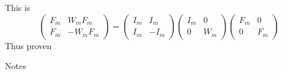 \documentclass{article}
\begin{document}
	This is
	\begin{equation}
		\begin{pmatrix}
			F_m & W_mF_m \\
			F_m & -W_mF_m
		\end{pmatrix}
		=
		\begin{pmatrix}
			I_m & I_m \\
			I_m & -I_m
		\end{pmatrix}
		\begin{pmatrix}
			I_m & 0 \\
			0 & W_m
		\end{pmatrix}
			\begin{pmatrix}
				F_m & 0 \\
				0 & F_m
			\end{pmatrix}
	\end{equation}
	Thus proven
	
	
	Notes
	
\end{document}
